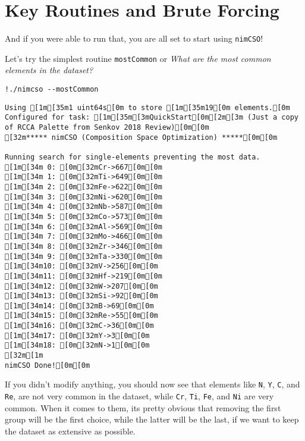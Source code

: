 \hypertarget{key-routines-and-brute-forcing}{%
\section{Key Routines and Brute
Forcing}\label{nimcsotutorial:key-routines-and-brute-forcing}}

And if you were able to run that, you are all set to start using
\texttt{nimCSO}!

Let's try the simplest routine \texttt{mostCommon} or
\emph{What are the most common elements in the dataset?}

\begin{verbatim}
!./nimcso --mostCommon
\end{verbatim}

\begin{verbatim}
Using [1m[35m1 uint64s[0m to store [1m[35m19[0m elements.[0m
Configured for task: [1m[35m[3mQuickStart[0m[2m[3m (Just a copy of RCCA Palette from Senkov 2018 Review)[0m[0m
[32m***** nimCSO (Composition Space Optimization) *****[0m[0m

Running search for single-elements preventing the most data.
[1m[34m 0: [0m[32mCr->667[0m[0m
[1m[34m 1: [0m[32mTi->649[0m[0m
[1m[34m 2: [0m[32mFe->622[0m[0m
[1m[34m 3: [0m[32mNi->620[0m[0m
[1m[34m 4: [0m[32mNb->587[0m[0m
[1m[34m 5: [0m[32mCo->573[0m[0m
[1m[34m 6: [0m[32mAl->569[0m[0m
[1m[34m 7: [0m[32mMo->466[0m[0m
[1m[34m 8: [0m[32mZr->346[0m[0m
[1m[34m 9: [0m[32mTa->330[0m[0m
[1m[34m10: [0m[32mV->256[0m[0m
[1m[34m11: [0m[32mHf->219[0m[0m
[1m[34m12: [0m[32mW->207[0m[0m
[1m[34m13: [0m[32mSi->92[0m[0m
[1m[34m14: [0m[32mB->69[0m[0m
[1m[34m15: [0m[32mRe->55[0m[0m
[1m[34m16: [0m[32mC->36[0m[0m
[1m[34m17: [0m[32mY->3[0m[0m
[1m[34m18: [0m[32mN->1[0m[0m
[32m[1m
nimCSO Done![0m[0m
\end{verbatim}

If you didn't modify anything, you should now see that elements like
\texttt{N}, \texttt{Y},
\texttt{C}, and \texttt{Re}, are not
very common in the dataset, while \texttt{Cr},
\texttt{Ti}, \texttt{Fe}, and
\texttt{Ni} are very common. When it comes to them, its
pretty obvious that removing the first group will be the first choice,
while the latter will be the last, if we want to keep the dataset as
extensive as possible.

